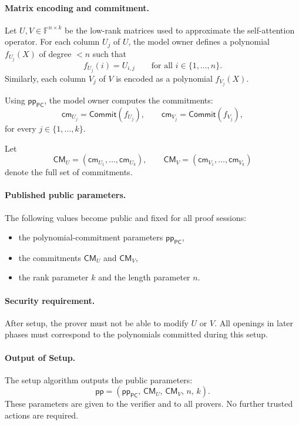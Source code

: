 \documentclass[11pt]{article}
\begin{document}
\paragraph{Matrix encoding and commitment.}
Let $U, V \in \mathbb{F}^{n \times k}$ be the low-rank matrices used to
approximate the self-attention operator.
For each column $U_j$ of $U$, the model owner defines a polynomial
$f_{U_j}(X)$ of degree $< n$ such that
\[
  f_{U_j}(i) = U_{i,j} \qquad \text{for all } i \in \{1,\dots,n\}.
\]
Similarly, each column $V_j$ of $V$ is encoded as a polynomial
$f_{V_j}(X)$.

Using $\mathsf{pp}_{\mathsf{PC}}$, the model owner computes the
commitments:
\[
  \mathsf{cm}_{U_j} = \mathsf{Commit}(f_{U_j}), \qquad
  \mathsf{cm}_{V_j} = \mathsf{Commit}(f_{V_j}),
\]
for every $j \in \{1,\dots,k\}$.

Let
\[
  \mathsf{CM}_U = (\mathsf{cm}_{U_1}, \dots, \mathsf{cm}_{U_k}), \qquad
  \mathsf{CM}_V = (\mathsf{cm}_{V_1}, \dots, \mathsf{cm}_{V_k})
\]
denote the full set of commitments.

\paragraph{Published public parameters.}
The following values become public and fixed for all proof sessions:
\begin{itemize}
  \item the polynomial-commitment parameters $\mathsf{pp}_{\mathsf{PC}}$,
  \item the commitments $\mathsf{CM}_U$ and $\mathsf{CM}_V$,
  \item the rank parameter $k$ and the length parameter $n$.
\end{itemize}

\paragraph{Security requirement.}
After setup, the prover must not be able to modify $U$ or $V$.
All openings in later phases must correspond to the polynomials committed
during this setup.

\paragraph{Output of Setup.}
The setup algorithm outputs the public parameters:
\[
  \mathsf{pp} = (\mathsf{pp}_{\mathsf{PC}},\, \mathsf{CM}_U,\, 
                 \mathsf{CM}_V,\, n,\, k).
\]
These parameters are given to the verifier and to all provers.
No further trusted actions are required.
\end{document}
